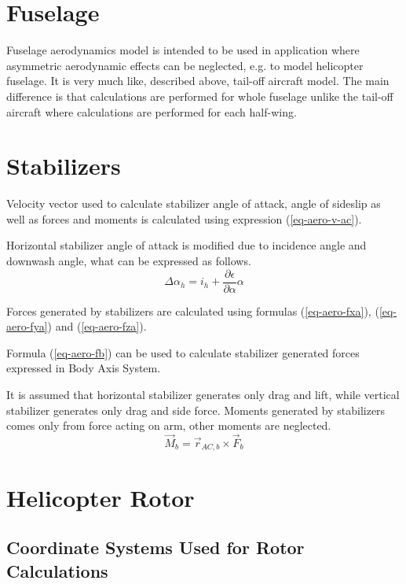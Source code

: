 \section{Fuselage}

Fuselage aerodynamics model is intended to be used in application where asymmetric aerodynamic effects can be neglected, e.g. to model helicopter fuselage. It is very much like, described above, tail-off aircraft model. The main difference is that calculations are performed for whole fuselage unlike the tail-off aircraft where calculations are performed for each half-wing.

\section{Stabilizers}

Velocity vector used to calculate stabilizer angle of attack, angle of sideslip as well as forces and moments is calculated using expression (\ref{eq-aero-v-ac}).

Horizontal stabilizer angle of attack is modified due to incidence angle and downwash angle, what can be expressed as follows. \cite{Etkin1972}
\begin{equation}
  \Delta \alpha_h
  =
  i_h + \frac{ \partial \epsilon }{ \partial \alpha } \alpha
\end{equation}

Forces generated by stabilizers are calculated using formulas (\ref{eq-aero-fxa}), (\ref{eq-aero-fya}) and (\ref{eq-aero-fza}).

Formula (\ref{eq-aero-fb}) can be used to calculate stabilizer generated forces expressed in Body Axis System.

It is assumed that horizontal stabilizer generates only drag and lift, while vertical stabilizer generates only drag and side force. Moments generated by stabilizers comes only from force acting on arm, other moments are neglected.
\begin{equation}
  {\vec M}_b = {\vec r}_{AC,b} \times {\vec F}_b
\end{equation}

\section{Helicopter Rotor}

\subsection{Coordinate Systems Used for Rotor Calculations}

